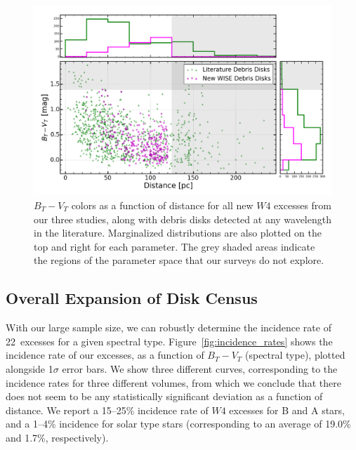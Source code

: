     \begin{figure}
    \centering
    \includegraphics[width=\textwidth]{Ch5/wise_lit_120pc}
    \caption[Comparison of All Known Debris Disks To Those Detected by \WS]{$B_T-V_T$ colors as a function of distance for all new $W4$ excesses from our three studies, along with debris disks detected at any wavelength in the literature. Marginalized distributions are also plotted on the top and right for each parameter. The grey shaded areas indicate the regions of the parameter space that our surveys do not explore.}
    \label{fig:wise_v_lit}
    \end{figure}
    \subsection{Overall Expansion of Disk Census}

    With our large sample size, we can robustly determine the incidence rate of 22\micron\ excesses for a given spectral type. Figure~\ref{fig:incidence_rates} shows the incidence rate of our excesses, as a function of $B_T-V_T$ (spectral type), plotted alongside 1$\sigma$ error bars. We show three different curves, corresponding to the incidence rates for three different volumes, from which we conclude that there does not seem to be any statistically significant deviation as a function of distance. We report a 15--25\% incidence rate of $W4$ excesses for B and A stars, and a 1--4\% incidence for solar type stars (corresponding to an average of 19.0\% and 1.7\%, respectively).


